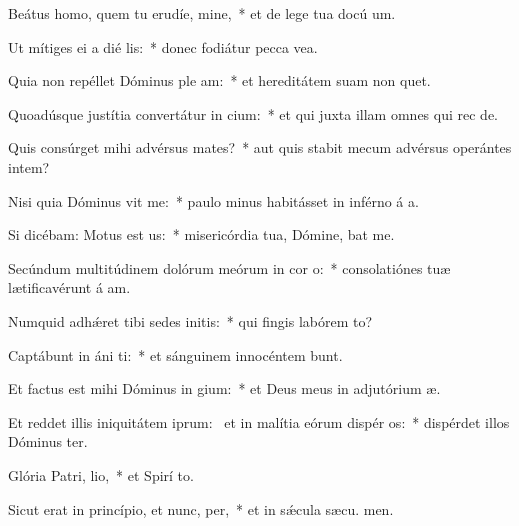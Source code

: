 \item Beátus homo, quem tu erudíe, mine,~* et de lege tua docú um.
\item Ut mítiges ei a dié lis:~* donec fodiátur pecca vea.
\item Quia non repéllet Dóminus ple am:~* et hereditátem suam non quet.
\item Quoadúsque justítia convertátur in cium:~* et qui juxta illam omnes qui rec  de.
\item Quis consúrget mihi advérsus mates?~* aut quis stabit mecum advérsus operántes intem?
\item Nisi quia Dóminus vit me:~* paulo minus habitásset in inférno á a.
\item Si dicébam: Motus est  us:~* misericórdia tua, Dómine, bat me.
\item Secúndum multitúdinem dolórum meórum in cor o:~* consolatiónes tuæ lætificavérunt á am.
\item Numquid adhǽret tibi sedes initis:~* qui fingis labórem  to?
\item Captábunt in áni ti:~* et sánguinem innocéntem bunt.
\item Et factus est mihi Dóminus in gium:~* et Deus meus in adjutórium  æ.
\item Et reddet illis iniquitátem iprum:~\pscross{} et in malítia eórum dispér os:~* dispérdet illos Dóminus  ter.
\item Glória Patri,  lio,~* et Spirí to.
\item Sicut erat in princípio, et nunc,  per,~* et in sǽcula sæcu. men.
